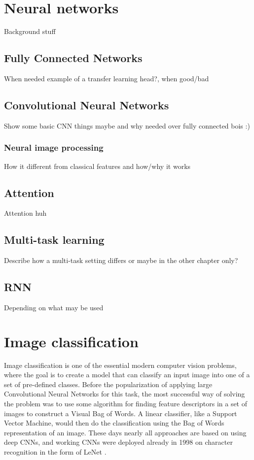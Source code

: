 \chapter{Neural networks}
Background stuff 
\section{Fully Connected Networks}
When needed example of a transfer learning head?, when good/bad
\section{Convolutional Neural Networks}
Show some basic CNN things maybe and why needed over fully connected bois :) 
\subsection{Neural image processing}
How it different from classical features and how/why it works
\section{Attention}
Attention huh
\section{Multi-task learning}
Describe how a multi-task setting differs or maybe in the other chapter only?
\section{RNN}
Depending on what may be used



\chapter{Image classification}
Image classification is one of the essential modern computer vision problems, where the goal is to create a model that can classify an input image into one of a set of pre-defined classes. Before the popularization of applying large Convolutional Neural Networks for this task, the most successful way of solving the problem was to use some algorithm for finding feature descriptors in a set of images to construct a Visual Bag of Words.  A linear classifier, like a Support Vector Machine, would then do the classification using the Bag of Words representation of an image. These days nearly all approaches are based on using deep CNNs, and working CNNs were deployed already in 1998 on character recognition in the form of LeNet \citep{leNet}.

